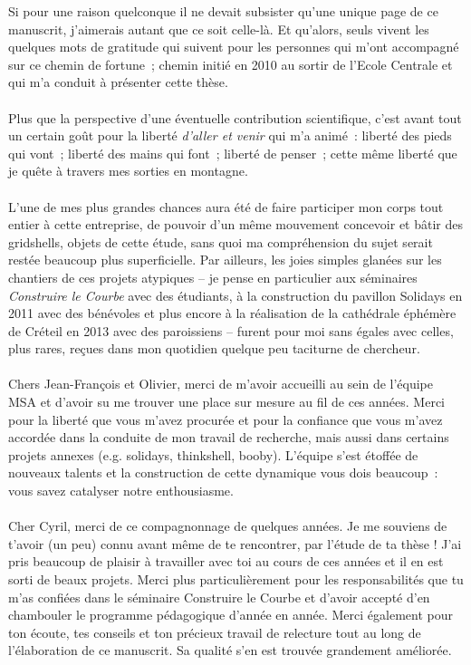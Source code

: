 Si pour une raison quelconque il ne devait subsister qu'une unique page de ce manuscrit, j'aimerais autant que ce soit celle-là. Et qu'alors, seuls vivent les quelques mots de gratitude qui suivent pour les personnes qui m'ont accompagné sur ce chemin de fortune~; chemin initié en 2010 au sortir de l'Ecole Centrale et qui m'a conduit à présenter cette thèse.
\\
\\
Plus que la perspective d'une éventuelle contribution scientifique, c'est avant tout un certain goût pour la liberté \emph{d'aller et venir} qui m'a animé~: liberté des pieds qui vont~; liberté des mains qui font~; liberté de penser~; cette même liberté que je quête à travers mes sorties en montagne.
\\
\\
L'une de mes plus grandes chances aura été de faire participer mon corps tout entier à cette entreprise, de pouvoir d'un même mouvement concevoir et bâtir des gridshells, objets de cette étude, sans quoi ma compréhension du sujet serait restée beaucoup plus superficielle. Par ailleurs, les joies simples glanées sur les chantiers de ces projets atypiques -- je pense en particulier aux séminaires \emph{Construire le Courbe} avec des étudiants, à la construction du pavillon Solidays en 2011 avec des bénévoles et plus encore à la réalisation de la cathédrale éphémère de Créteil en 2013 avec des paroissiens -- furent pour moi sans égales avec celles, plus rares, reçues dans mon quotidien quelque peu taciturne de chercheur.
\\
\\
Chers Jean-François et Olivier, merci de m'avoir accueilli au sein de l'équipe MSA et d'avoir su me trouver une place sur mesure au fil de ces années. Merci pour la liberté que vous m'avez procurée et pour la confiance que vous m'avez accordée dans la conduite de mon travail de recherche, mais aussi dans certains projets annexes (e.g. solidays, thinkshell, booby). L'équipe s'est étoffée de nouveaux talents et la construction de cette dynamique vous dois beaucoup~: vous savez catalyser notre enthousiasme.
\\
\\
Cher Cyril, merci de ce compagnonnage de quelques années. Je me souviens de t'avoir (un peu) connu avant même de te rencontrer, par l'étude de ta thèse ! J'ai pris beaucoup de plaisir à travailler avec toi au cours de ces années et il en est sorti de beaux projets. Merci plus particulièrement pour les responsabilités que tu m'as confiées dans le séminaire Construire le Courbe et d'avoir accepté d'en chambouler le programme pédagogique d'année en année. Merci également pour ton écoute, tes conseils et ton précieux travail de relecture tout au long de l'élaboration de ce manuscrit. Sa qualité s'en est trouvée grandement améliorée.
